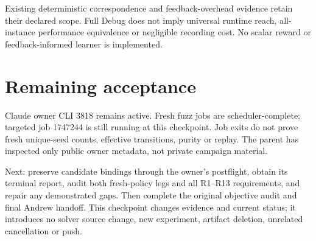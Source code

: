 \documentclass[10pt]{article}
\begin{document}
Existing deterministic correspondence and feedback-overhead evidence retain
their declared scope. Full Debug does not imply universal runtime reach,
all-instance performance equivalence or negligible recording cost. No scalar
reward or feedback-informed learner is implemented.

\section*{Remaining acceptance}
Claude owner CLI 3818 remains active. Fresh fuzz jobs are scheduler-complete;
targeted job 1747244 is still running at this checkpoint. Job exits do not prove
fresh unique-seed counts, effective transitions, purity or replay. The parent
has inspected only public owner metadata, not private campaign material.

Next: preserve candidate bindings through the owner's postflight, obtain its
terminal report, audit both fresh-policy legs and all R1--R13 requirements,
and repair any demonstrated gaps. Then complete the original objective audit
and final Andrew handoff. This checkpoint changes evidence and current status;
it introduces no solver source change, new experiment, artifact deletion,
unrelated cancellation or push.
\end{document}
